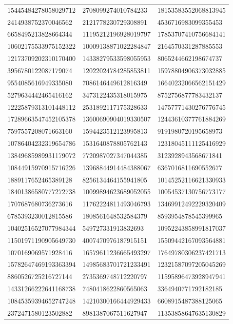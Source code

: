 \begin{longtable}{*{3}{l}}
15445484278058029712&2708099274010784233&18153583552068813945\\
2414938752370046562&2121778230729308891&4536716983099355453\\
6658495213828664344&11195212196928019797&17853707410756684141\\
10602175533975152322&10009138871022284847&2164570331287885553\\
12173709202310170400&14338279533598055953&8065244662198674737\\
3956780122087179074&12022024784285853811&15978804906373032885\\
9554085616949335080&7086146449612816349&16640232066562151429\\
5279634442465416162&3473122435318015975&8752756877783432137\\
12225879313101448112&2531892117175328633&14757771430276776745\\
17289663547452105378&13600690904019330507&12443610377761884269\\
7597557208071663160&1594423512123995813&9191980720195658973\\
10786404232319654786&1531640878805762143&12318045111125416929\\
13849685989931179072&7720987027347044385&3123928943568671841\\
10844915970915716226&13968844914484388067&6367016811690552677\\
1889117652465389128&8256134464155941805&10145252116621330933\\
18401386580777272738&10099894623689052055&10054537130756773177\\
1707687680736273616&11762224811493046793&13469912492229320409\\
6785393230012815586&1808561648532584379&8593954878545399965\\
10402516527077984344&549727331913832693&10952243858991817037\\
11501971190905649730&4007470976187915151&15509442167093564881\\
1070169069571928416&16579611236665493297&17649780306237421713\\
15782647469193363394&14985683701721233491&12321587097205045269\\
8860526725216727144&2735369748712220797&11595896473928947941\\
14331266222641168738&7480418622860565063&3364940771792182185\\
10845359394652747248&14210300166444929433&6608915487388125065\\
2372471580123502882&8981387067511627947&11353858647635130829\\

\end{longtable}
